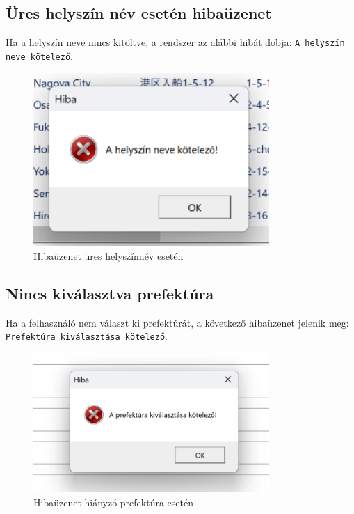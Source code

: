 \documentclass{report}[11pt]
\begin{document}
\subsection{Üres helyszín név esetén hibaüzenet}
Ha a helyszín neve nincs kitöltve, a rendszer az alábbi hibát dobja: \texttt{A helyszín neve kötelező}.

\begin{figure}[H]
    \centering
    \includegraphics[width=0.8\textwidth]{figures/location_name_empty_error.png}
    \caption{Hibaüzenet üres helyszínnév esetén}
    \label{fig:empty_location}
\end{figure}

\subsection{Nincs kiválasztva prefektúra}
Ha a felhasználó nem választ ki prefektúrát, a következő hibaüzenet jelenik meg: \texttt{Prefektúra kiválasztása kötelező}.

\begin{figure}[H]
    \centering
    \includegraphics[width=0.8\textwidth]{figures/prefecture_not_selected_error.png}
    \caption{Hibaüzenet hiányzó prefektúra esetén}
    \label{fig:missing_prefecture}
\end{figure}
\end{document}
